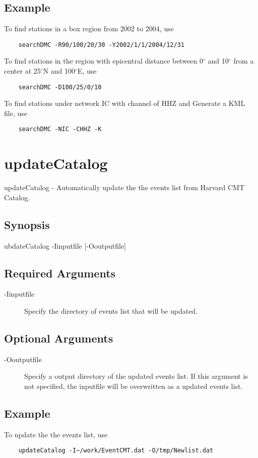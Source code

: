 \documentclass[12pt, a4paper]{report}
\begin{document}
\subsection{Example}
To find stations in a box region from 2002 to 2004, use
\begin{lstlisting}
	searchDMC -R90/100/20/30 -Y2002/1/1/2004/12/31
\end{lstlisting}
To find stations in the region with epicentral distance between 0$^\circ$ and 10$^\circ$ from a center at 25$^\circ$N and 100$^\circ$E, use
\begin{lstlisting}
	searchDMC -D100/25/0/10
\end{lstlisting}
To find stations under network {\C IC} with channel of {\C HHZ} and Generate a KML file, use
\begin{lstlisting}
	searchDMC -NIC -CHHZ -K
\end{lstlisting}

\section{updateCatalog}
updateCatalog - Automatically update the the events list from Harvard CMT Catalog.
\subsection{Synopsis}
{\tb ubdateCatalog} {\tb -I}{\ti inputfile} [{\tb -O}{\ti outputfile}]
\subsection{Required Arguments}
\begin{description}
\item[{\tb -I}{\ti inputfile}] Specify the directory of events list that will be updated.
\end{description}
\subsection{Optional Arguments}
\begin{description}
\item[{\tb -O}{\ti outputfile}] Specify a output directory of the updated events list. If this argument is not specified, the {\ti inputfile} will be overwritten as a updated events list.
\end{description}
\subsection{Example}
To update the the events list, use
\begin{lstlisting}
	updateCatalog -I~/work/EventCMT.dat -O/tmp/Newlist.dat 
\end{lstlisting}
\end{document}
